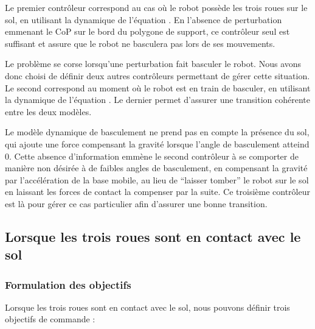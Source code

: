  			Le premier contrôleur correspond au cas où le robot possède les trois roues sur le sol, en utilisant la dynamique de l'équation . 
 			En l'absence de perturbation emmenant le CoP sur le bord du polygone de support, 
 			ce contrôleur seul est suffisant et assure que le robot ne basculera pas lors de ses mouvements.
 			
 			Le problème se corse lorsqu'une perturbation fait basculer le robot.
 			Nous avons donc choisi de définir deux autres contrôleurs permettant de gérer cette situation. 
 			Le second correspond au moment où le robot est en train de basculer, en utilisant la dynamique de l'équation .
 			Le dernier permet d'assurer une transition cohérente entre les deux modèles.
 			
 			Le modèle dynamique de basculement  ne prend pas en compte la présence du sol, qui ajoute une force compensant la gravité lorsque l'angle de basculement atteind $0$.
 			Cette absence d'information emmène le second contrôleur à se comporter de manière non désirée à de faibles angles de basculement, en compensant la gravité par l'accélération de la base mobile, au lieu de ``laisser tomber'' le robot sur le sol en laissant les forces de contact la compenser par la suite.
 			Ce troisième contrôleur est là pour gérer ce cas particulier afin d'assurer une bonne transition.

		\subsection{Lorsque les trois roues sont en contact avec le sol}
			\label{section.mpc_trois_roues}
			\subsubsection{Formulation des objectifs}
			\label{section.objectifs3roues}

				Lorsque les trois roues sont en contact avec le sol, nous pouvons définir trois objectifs de commande :
				
